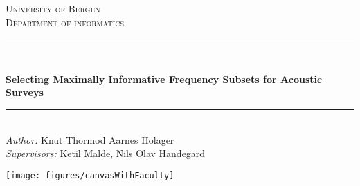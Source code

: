 \begin{titlepage}

\newcommand{\HRule}{\rule{\linewidth}{0.5mm}} %

\center %
 

\textsc{\LARGE University of Bergen \\ Department of informatics}\\[1.5cm] %


\HRule \\[0.5cm]
\begin{Huge}
	\bfseries{Selecting Maximally Informative Frequency Subsets for Acoustic Surveys}\\[0.7cm] %
\end{Huge}



\HRule \\[0.5cm]


\large \emph{Author:} Knut Thormod Aarnes Holager\\
\large \emph{Supervisors:} Ketil Malde, Nils Olav Handegard\\[2cm]


\centerline{\texttt{[image: figures/canvasWithFaculty]}}


\end{titlepage}
